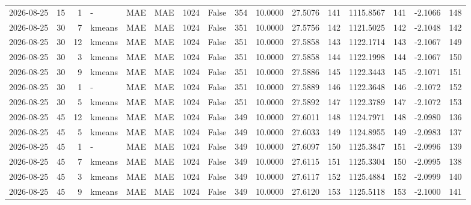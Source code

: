 \documentclass[10pt]{article}
\begin{document}
\begin{landscape}
\begin{longtable}{@{}lrrlllrcrrrrrrrr@{}}
2026-08-25 & 15 & 1 & - & MAE & MAE & 1024 & False & 354 & 10.0000 & 27.5076 & 141 & 1115.8567 & 141 & -2.1066 & 148 \\
2026-08-25 & 30 & 7 & kmeans & MAE & MAE & 1024 & False & 351 & 10.0000 & 27.5756 & 142 & 1121.5025 & 142 & -2.1048 & 142 \\
2026-08-25 & 30 & 12 & kmeans & MAE & MAE & 1024 & False & 351 & 10.0000 & 27.5858 & 143 & 1122.1714 & 143 & -2.1067 & 149 \\
2026-08-25 & 30 & 3 & kmeans & MAE & MAE & 1024 & False & 351 & 10.0000 & 27.5858 & 144 & 1122.1998 & 144 & -2.1067 & 150 \\
2026-08-25 & 30 & 9 & kmeans & MAE & MAE & 1024 & False & 351 & 10.0000 & 27.5886 & 145 & 1122.3443 & 145 & -2.1071 & 151 \\
2026-08-25 & 30 & 1 & - & MAE & MAE & 1024 & False & 351 & 10.0000 & 27.5889 & 146 & 1122.3648 & 146 & -2.1072 & 152 \\
2026-08-25 & 30 & 5 & kmeans & MAE & MAE & 1024 & False & 351 & 10.0000 & 27.5892 & 147 & 1122.3789 & 147 & -2.1072 & 153 \\
2026-08-25 & 45 & 12 & kmeans & MAE & MAE & 1024 & False & 349 & 10.0000 & 27.6011 & 148 & 1124.7971 & 148 & -2.0980 & 136 \\
2026-08-25 & 45 & 5 & kmeans & MAE & MAE & 1024 & False & 349 & 10.0000 & 27.6033 & 149 & 1124.8955 & 149 & -2.0983 & 137 \\
2026-08-25 & 45 & 1 & - & MAE & MAE & 1024 & False & 349 & 10.0000 & 27.6097 & 150 & 1125.3847 & 151 & -2.0996 & 139 \\
2026-08-25 & 45 & 7 & kmeans & MAE & MAE & 1024 & False & 349 & 10.0000 & 27.6115 & 151 & 1125.3304 & 150 & -2.0995 & 138 \\
2026-08-25 & 45 & 3 & kmeans & MAE & MAE & 1024 & False & 349 & 10.0000 & 27.6117 & 152 & 1125.4884 & 152 & -2.0999 & 140 \\
2026-08-25 & 45 & 9 & kmeans & MAE & MAE & 1024 & False & 349 & 10.0000 & 27.6120 & 153 & 1125.5118 & 153 & -2.1000 & 141 \\
\bottomrule
\end{longtable}
\clearpage

\end{landscape}
\end{document}
